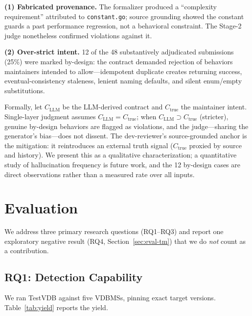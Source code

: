 \documentclass[sigconf]{acmart}
\begin{document}
\textbf{(1) Fabricated provenance.} The formalizer produced a ``complexity requirement'' attributed to \texttt{constant.go}; source grounding showed the constant guards a past performance regression, not a behavioral constraint. The Stage-2 judge nonetheless confirmed violations against it.

\textbf{(2) Over-strict intent.} 12 of the 48 substantively adjudicated submissions (25\%) were marked by-design: the contract demanded rejection of behaviors maintainers intended to allow---idempotent duplicate creates returning success, eventual-consistency staleness, lenient naming defaults, and silent enum/empty substitutions.

Formally, let $C_{\mathrm{LLM}}$ be the LLM-derived contract and $C_{\mathrm{true}}$ the maintainer intent. Single-layer judgment assumes $C_{\mathrm{LLM}} = C_{\mathrm{true}}$; when $C_{\mathrm{LLM}} \supset C_{\mathrm{true}}$ (stricter), genuine by-design behaviors are flagged as violations, and the judge---sharing the generator's bias---does not dissent. The dev-reviewer's source-grounded anchor is the mitigation: it reintroduces an external truth signal ($C_{\mathrm{true}}$ proxied by source and history). We present this as a qualitative characterization; a quantitative study of hallucination frequency is future work, and the 12 by-design cases are direct observations rather than a measured rate over all inputs.

\section{Evaluation}\label{sec:eval}

We address three primary research questions (RQ1--RQ3) and report one exploratory negative result (RQ4, Section~\ref{sec:eval-tm}) that we do \emph{not} count as a contribution.

\subsection{RQ1: Detection Capability}
We ran TestVDB against five VDBMSs, pinning exact target versions. Table~\ref{tab:yield} reports the yield.
\end{document}
